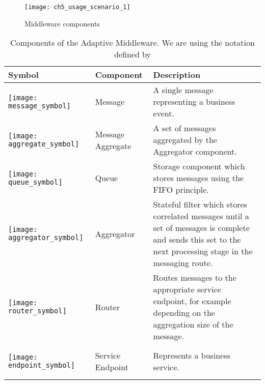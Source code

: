 \begin{figure}[htpb]
	\centering
	\texttt{[image: ch5\_usage\_scenario\_1]}
	\caption{Middleware components}
	\label{fig:ch4_usage_scenario_1}
\end{figure}

\begin{table}[htpb]
	\caption{Components of the Adaptive Middleware. We are using the notation defined by \cite{Hohpe:2003fk}}
	\label{table:ch4_middleware_components}
	\centering
	\begin{tabular}{|m{3cm}|m{2cm}|m{5cm}|}
		\hline
		\bfseries Symbol & \bfseries Component & \bfseries Description\\
		\hline 
		\begin{center}
			\texttt{[image: message\_symbol]}
		\end{center} 
		& Message & A single message representing a business event.\\
		\hline 
		\begin{center}
			\texttt{[image: aggregate\_symbol]} 
		\end{center}
		& Message Aggregate & A set of messages aggregated by the Aggregator component.\\
		\hline
		\begin{center}
			\texttt{[image: queue\_symbol]} 
		\end{center}
		& Queue & Storage component which stores messages using the \ac{FIFO} principle.\\
		\hline 
		\begin{center}
			\texttt{[image: aggregator\_symbol]}
		\end{center}
		& Aggregator & Stateful filter which stores correlated messages until a set of messages is complete and sends this set to the next processing stage in the messaging route.\\
		\hline
		\begin{center}
			\texttt{[image: router\_symbol]} 
		\end{center}
		& Router & Routes messages to the appropriate service endpoint, for example depending on the aggregation size of the message.\\
		\hline
		\begin{center}
			\texttt{[image: endpoint\_symbol]} 
		\end{center}
		& Service Endpoint & Represents a business service.\\
		\hline
	\end{tabular}
\end{table}

